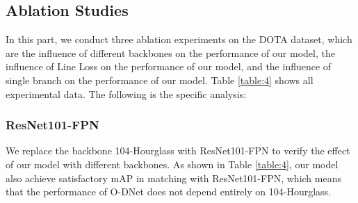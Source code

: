 \documentclass[runningheads]{llncs}
\begin{document}
\begin{table*}[!h]
	\centering
	\vspace{10pt}	
	\caption{Ablation Studies on DOTA. \textit{ResNet101-FPN} means that the backbone of our model is replaced by ResNet101-FPN. \textit{Without Line Loss} denotes that we only keep the  part of the total Line Loss. \textit{Single branch} means that we only keep the second branch of O-DNet.}
	\label{table:4}
\end{table*}

\subsection{Ablation Studies}

In this part, we conduct three ablation experiments on the DOTA dataset, which are the influence of different backbones on the performance of our model, the influence of Line Loss on the performance of our model, and the influence of single branch on the performance of our model. Table \ref{table:4} shows all experimental data. The following is the specific analysis:


\subsubsection{ResNet101-FPN} 

We replace the backbone 104-Hourglass with ResNet101-FPN\cite{lin2017feature} to verify the effect of our model with different backbones. As shown in Table \ref{table:4}, our model  also achieve satisfactory  mAP in matching with ResNet101-FPN, which means that the performance of O-DNet does not depend entirely on 104-Hourglass.
\end{document}
